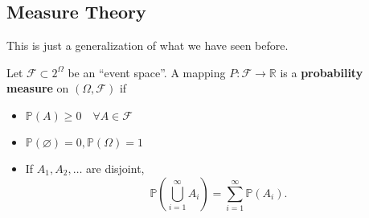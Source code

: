 \subsection{Measure Theory}

This is just a generalization of what we have seen before.

\begin{definition}
	Let \( \mathcal{F} \subset 2^{\Omega }  \) be an ``event space''. A mapping \( P : \mathcal{F} \to  \mathbb{R} \) is a \textbf{probability measure} on \( (\Omega , \mathcal{F}) \) if 
	\begin{itemize}
		\item \( \mathbb{P}(A) \ge 0 \quad \forall A \in \mathcal{F} \)
		\item \( \mathbb{P}(\varnothing) = 0, \mathbb{P}(\Omega) = 1\)
		\item If \( A_{1},A_{2},\ldots  \) are disjoint, \[
				\mathbb{P}(\bigcup_{i = 1}^{\infty}A_i ) = \sum_{i=1}^{\infty} \mathbb{P}(A_i)
		.\] 
	\end{itemize}
\end{definition}
